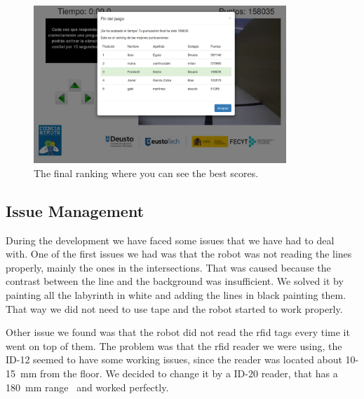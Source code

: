 \begin{figure}[!htbp]
	\centering
	\includegraphics[width=0.85\textwidth]{fig/manuals/trivial/romie-ranking}
	\caption{The final ranking where you can see the best scores.}
	\label{fig:man:romie_ranking}
\end{figure}

\subsection{Issue Management}

During the development we have faced some issues that we have had to deal with. One of the first
issues we had was that the robot was not reading the lines properly, mainly the ones in the
intersections. That was caused because the contrast between the line and the background was
insufficient. We solved it by painting all the labyrinth in white and adding the lines in black
painting them. That way we did not need to use tape and the robot started to work properly.

Other issue we found was that the robot did not read the \acrshort{rfid} tags every time it went on
top of them. The problem was that the \acrshort{rfid} reader we were using, the ID-12 seemed to have
some working issues, since the reader was located about 10-15~mm from the floor. We decided to
change it by a ID-20 reader, that has a 180~mm range~\cite{rfid} and worked perfectly.

